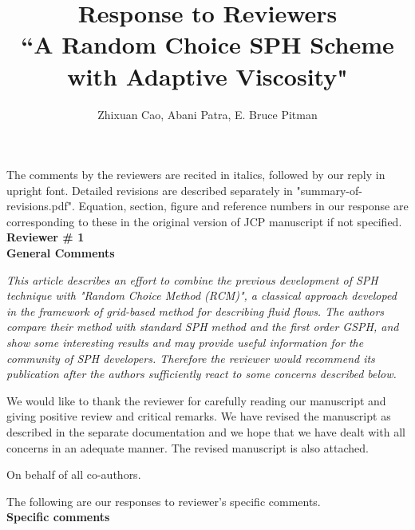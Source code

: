 \documentclass[10pt,a4paper]{article}
\begin{document}
\author{\Large {Zhixuan Cao, Abani Patra, E. Bruce Pitman}}

\title{
\LARGE \textbf{Response to Reviewers} \\
\Large \textbf{``A Random Choice SPH Scheme with Adaptive Viscosity"}}

\date{\vspace{-5ex}}

\maketitle
The comments by the reviewers are recited in italics, followed by our reply in upright font. Detailed revisions are described separately in "summary-of-revisions.pdf". Equation, section, figure and reference numbers in our response are corresponding to these in the original 
version of JCP manuscript if not specified. \\[12pt]

\textbf{\Large Reviewer \# 1}\\[3pt]

\textbf{\large General Comments}

\textit{This article describes an effort to combine the previous development of SPH technique with "Random Choice Method (RCM)", a classical approach developed in the framework of grid-based method for
describing fluid flows. The authors compare their method with standard SPH method and the first order GSPH, and show some interesting results and may provide useful information for the community of SPH developers. Therefore the reviewer would recommend its publication after the authors sufficiently react to some concerns described below.} 

We would like to thank the reviewer for carefully reading our manuscript and giving positive review and critical remarks.
We have revised the manuscript as described in the separate documentation and we hope that we have dealt with all concerns in an adequate manner. The revised manuscript is also attached.
 
On behalf of all co-authors.

The following are our responses to reviewer's specific comments.\\[12pt]

\textbf{\large Specific comments}
\end{document}
